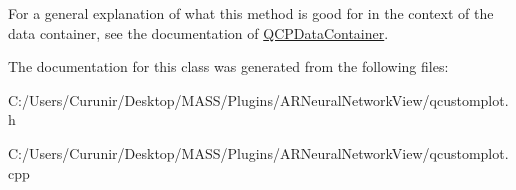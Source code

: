 For a general explanation of what this method is good for in the context of the data container, see the documentation of \hyperlink{class_q_c_p_data_container}{Q\+C\+P\+Data\+Container}. 

The documentation for this class was generated from the following files\+:\begin{DoxyCompactItemize}
\item 
C\+:/\+Users/\+Curunir/\+Desktop/\+M\+A\+S\+S/\+Plugins/\+A\+R\+Neural\+Network\+View/qcustomplot.\+h\item 
C\+:/\+Users/\+Curunir/\+Desktop/\+M\+A\+S\+S/\+Plugins/\+A\+R\+Neural\+Network\+View/qcustomplot.\+cpp\end{DoxyCompactItemize}
